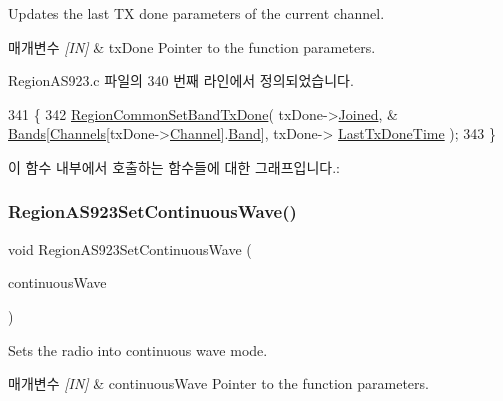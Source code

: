 Updates the last TX done parameters of the current channel. 


\begin{DoxyParams}{매개변수}
{\em \mbox{[}\+I\+N\mbox{]}} & tx\+Done Pointer to the function parameters. \\
\hline
\end{DoxyParams}


Region\+A\+S923.\+c 파일의 340 번째 라인에서 정의되었습니다.


\begin{DoxyCode}
341 \{
342     \mbox{\hyperlink{group___r_e_g_i_o_n_c_o_m_m_o_n_ga491dea5590228a0cd33affd71743779c}{RegionCommonSetBandTxDone}}( txDone->\mbox{\hyperlink{structs_set_band_tx_done_params_ac2f6caa0f3b02d2ac5056c3ee7c22652}{Joined}}, &
      \mbox{\hyperlink{_region_a_s923_8c_a0b72a92a2d2766ee7cbc3ae162996cbf}{Bands}}[\mbox{\hyperlink{_region_a_s923_8c_a02bae2504563543865d6b0e81c48ab61}{Channels}}[txDone->\mbox{\hyperlink{structs_set_band_tx_done_params_a1ca6f01ca18afe402de51babe8c95f5e}{Channel}}].\mbox{\hyperlink{structs_channel_params_a724c03aa06953111c3291243831f251b}{Band}}], txDone->
      \mbox{\hyperlink{structs_set_band_tx_done_params_a7316dfb002c4e0015fceeb727020fe5c}{LastTxDoneTime}} );
343 \}
\end{DoxyCode}
이 함수 내부에서 호출하는 함수들에 대한 그래프입니다.\+:
\mbox{\label{group___r_e_g_i_o_n_a_s923_ga295747645e6d5ed51a52cb17cee132b4}} 
\subsubsection{\texorpdfstring{Region\+A\+S923\+Set\+Continuous\+Wave()}{RegionAS923SetContinuousWave()}}
{\footnotesize\ttfamily void Region\+A\+S923\+Set\+Continuous\+Wave (\begin{DoxyParamCaption}\item[{\mbox{\hyperlink{group___r_e_g_i_o_n_gaf39bb5ba06921139c6d17f88a8d518cd}{Continuous\+Wave\+Params\+\_\+t}} $\ast$}]{continuous\+Wave }\end{DoxyParamCaption})}



Sets the radio into continuous wave mode. 


\begin{DoxyParams}{매개변수}
{\em \mbox{[}\+I\+N\mbox{]}} & continuous\+Wave Pointer to the function parameters. \\
\hline
\end{DoxyParams}


